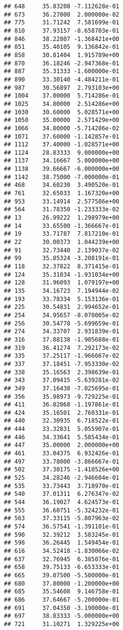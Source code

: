 \documentclass[
]{article}
\begin{document}
\begin{verbatim}
## 648     35.83208 -7.112628e-01
## 673     36.27000  2.000000e-02
## 775     31.71242  7.581699e-01
## 810     37.93157 -8.658703e-01
## 846     38.22807 -1.368421e+00
## 851     35.40105  9.136842e-01
## 858     30.81404  1.915789e+00
## 870     36.18246 -2.947368e-01
## 887     35.31333 -1.600000e-01
## 890     33.30140 -4.484211e-01
## 987     30.56897  2.793103e+00
## 1004    37.00000  5.714286e-01
## 1025    34.80000  2.514286e+00
## 1030    30.60000  5.028571e+00
## 1050    35.00000  2.571429e+00
## 1066    34.80000 -5.714286e-02
## 1071    37.60000 -1.142857e-01
## 1112    37.40000 -1.028571e+00
## 1124    28.83333  9.000000e+00
## 1137    34.16667  5.000000e+00
## 1138    39.66667 -6.000000e+00
## 1142    38.75000 -7.000000e-01
## 468     34.60230  3.490520e-01
## 761     32.65033  1.167320e+00
## 953     33.14914  2.577586e+00
## 564     31.78350 -1.233333e-02
## 13      26.99222  1.298979e+00
## 14      33.65500 -1.366667e-01
## 19      33.71787  7.817210e-01
## 22      30.00373  1.044239e+00
## 91      32.73440  2.139037e-02
## 99      35.85324 -3.208191e-01
## 118     32.37822  8.371415e-01
## 124     35.31034 -1.931034e+00
## 128     31.96093  1.079197e+00
## 135     34.16723  7.194944e-02
## 193     33.78334  5.153136e-01
## 225     30.54831  2.994652e-01
## 254     34.95657 -8.070005e-02
## 256     30.54778 -5.699659e-01
## 274     34.33707  2.931839e-01
## 316     37.88138 -1.905688e-01
## 319     36.41274  7.292173e-02
## 335     37.25117 -1.966667e-02
## 337     37.18451 -7.953330e-02
## 338     35.16563  2.398639e-01
## 343     37.09415 -5.639281e-02
## 349     37.16438 -7.025695e-01
## 356     35.98973 -9.729225e-01
## 411     36.82068 -1.197861e-01
## 424     35.16501  2.760331e-01
## 440     32.30935  6.718522e-01
## 444     33.32831  5.055907e-01
## 446     34.33641  5.585434e-01
## 447     35.00000  2.000000e+00
## 461     33.04375  6.932426e-01
## 497     33.78000 -3.866667e-01
## 502     37.30175 -1.410526e+00
## 525     34.28246 -2.946604e-01
## 535     33.73443  3.718970e-01
## 540     37.01311  6.276347e-02
## 544     36.19027  4.624573e-01
## 555     36.60751 -5.324232e-01
## 563     37.33115 -5.807963e-02
## 574     36.57541 -1.391101e-01
## 590     32.39212  3.583245e-01
## 598     36.26445  1.549454e-01
## 616     34.52418 -1.830066e-02
## 637     32.76945  6.385076e-01
## 658     39.75133 -6.653333e-01
## 665     39.07500 -5.500000e-01
## 680     37.80000 -1.200000e+00
## 685     35.54608  9.146758e-01
## 686     37.64667 -5.200000e-01
## 691     37.04350 -3.190000e-01
## 697     38.83333 -5.000000e+00
## 721     31.10271  1.329225e+00

\end{verbatim}
\end{document}
